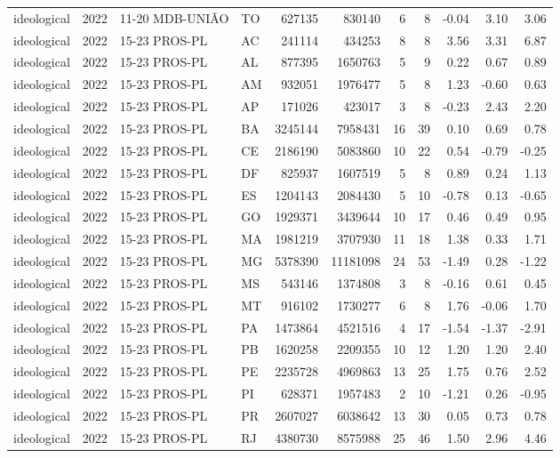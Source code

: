 \begin{landscape}
\begin{longtable}{lllL{1.4cm}rrrrrrr}
ideological & 2022 & 11-20 MDB-UNIÃO & TO & 627135 & 830140 & 6 & 8 & -0.04 & 3.10 & 3.06 \\
ideological & 2022 & 15-23 PROS-PL & AC & 241114 & 434253 & 8 & 8 & 3.56 & 3.31 & 6.87 \\
ideological & 2022 & 15-23 PROS-PL & AL & 877395 & 1650763 & 5 & 9 & 0.22 & 0.67 & 0.89 \\
ideological & 2022 & 15-23 PROS-PL & AM & 932051 & 1976477 & 5 & 8 & 1.23 & -0.60 & 0.63 \\
ideological & 2022 & 15-23 PROS-PL & AP & 171026 & 423017 & 3 & 8 & -0.23 & 2.43 & 2.20 \\
ideological & 2022 & 15-23 PROS-PL & BA & 3245144 & 7958431 & 16 & 39 & 0.10 & 0.69 & 0.78 \\
ideological & 2022 & 15-23 PROS-PL & CE & 2186190 & 5083860 & 10 & 22 & 0.54 & -0.79 & -0.25 \\
ideological & 2022 & 15-23 PROS-PL & DF & 825937 & 1607519 & 5 & 8 & 0.89 & 0.24 & 1.13 \\
ideological & 2022 & 15-23 PROS-PL & ES & 1204143 & 2084430 & 5 & 10 & -0.78 & 0.13 & -0.65 \\
ideological & 2022 & 15-23 PROS-PL & GO & 1929371 & 3439644 & 10 & 17 & 0.46 & 0.49 & 0.95 \\
ideological & 2022 & 15-23 PROS-PL & MA & 1981219 & 3707930 & 11 & 18 & 1.38 & 0.33 & 1.71 \\
ideological & 2022 & 15-23 PROS-PL & MG & 5378390 & 11181098 & 24 & 53 & -1.49 & 0.28 & -1.22 \\
ideological & 2022 & 15-23 PROS-PL & MS & 543146 & 1374808 & 3 & 8 & -0.16 & 0.61 & 0.45 \\
ideological & 2022 & 15-23 PROS-PL & MT & 916102 & 1730277 & 6 & 8 & 1.76 & -0.06 & 1.70 \\
ideological & 2022 & 15-23 PROS-PL & PA & 1473864 & 4521516 & 4 & 17 & -1.54 & -1.37 & -2.91 \\
ideological & 2022 & 15-23 PROS-PL & PB & 1620258 & 2209355 & 10 & 12 & 1.20 & 1.20 & 2.40 \\
ideological & 2022 & 15-23 PROS-PL & PE & 2235728 & 4969863 & 13 & 25 & 1.75 & 0.76 & 2.52 \\
ideological & 2022 & 15-23 PROS-PL & PI & 628371 & 1957483 & 2 & 10 & -1.21 & 0.26 & -0.95 \\
ideological & 2022 & 15-23 PROS-PL & PR & 2607027 & 6038642 & 13 & 30 & 0.05 & 0.73 & 0.78 \\
ideological & 2022 & 15-23 PROS-PL & RJ & 4380730 & 8575988 & 25 & 46 & 1.50 & 2.96 & 4.46 \\

\end{longtable}
\end{landscape}
